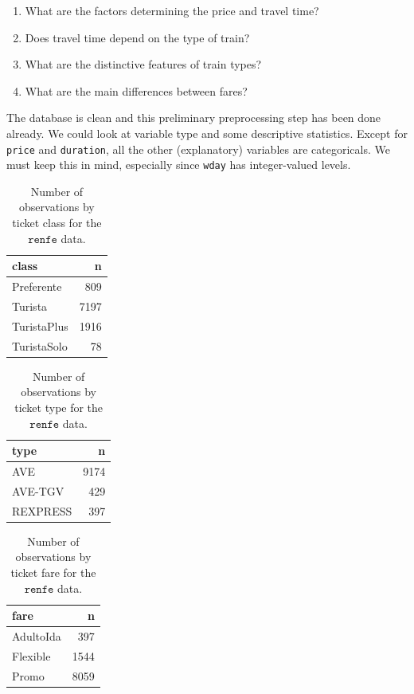 \documentclass[
  11pt,
  letterpaper,
]{book}
\providecommand{\tightlist}{%
  \setlength{\itemsep}{0pt}\setlength{\parskip}{0pt}}
\theoremstyle{definition}
\theoremstyle{definition}
\theoremstyle{definition}
\theoremstyle{definition}
\theoremstyle{remark}
\begin{document}
\begin{enumerate}
\def\labelenumi{\arabic{enumi}.}
\tightlist
\item
  What are the factors determining the price and travel time?
\item
  Does travel time depend on the type of train?
\item
  What are the distinctive features of train types?
\item
  What are the main differences between fares?
\end{enumerate}

The database is clean and this preliminary preprocessing step has been done already. We could look at variable type and some descriptive statistics.
Except for \texttt{price} and \texttt{duration}, all the other (explanatory) variables are categoricals. We must keep this in mind, especially since \texttt{wday} has integer-valued levels.

\begin{table}

\caption{\label{tab:renfe-aed1a}Number of observations by ticket class for the $\texttt{renfe}$ data.}
\centering
\begin{tabular}[t]{lr}
\toprule
class & n\\
\midrule
Preferente & 809\\
Turista & 7197\\
TuristaPlus & 1916\\
TuristaSolo & 78\\
\bottomrule
\end{tabular}
\end{table}

\begin{table}

\caption{\label{tab:renfe-aed1b}Number of observations by ticket type for the $\texttt{renfe}$ data.}
\centering
\begin{tabular}[t]{lr}
\toprule
type & n\\
\midrule
AVE & 9174\\
AVE-TGV & 429\\
REXPRESS & 397\\
\bottomrule
\end{tabular}
\end{table}

\begin{table}

\caption{\label{tab:renfe-aed1c}Number of observations by ticket fare for the $\texttt{renfe}$ data.}
\centering
\begin{tabular}[t]{lr}
\toprule
fare & n\\
\midrule
AdultoIda & 397\\
Flexible & 1544\\
Promo & 8059\\
\bottomrule
\end{tabular}
\end{table}
\end{document}
